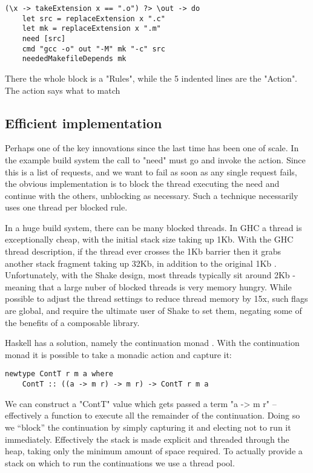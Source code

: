 \begin{lstlisting}
(\x -> takeExtension x == ".o") ?> \out -> do
    let src = replaceExtension x ".c"
    let mk = replaceExtension x ".m"
    need [src]
    cmd "gcc -o" out "-M" mk "-c" src
    neededMakefileDepends mk
\end{lstlisting}

There the whole block is a \lst"Rules", while the 5 indented lines are the \lst"Action". The action says what to match

\subsection{Efficient implementation}

Perhaps one of the key innovations since the last time has been one of scale. In the example build system the call to \lst"need" must go and invoke the action. Since this is a list of requests, and we want to fail as soon as any single request fails, the obvious implementation is to block the thread executing the need and continue with the others, unblocking as necessary. Such a technique necessarily uses one thread per blocked rule.

In a huge build system, there can be many blocked threads. In GHC a thread is exceptionally cheap, with the initial stack size taking up 1Kb. With the GHC thread description, if the thread ever crosses the 1Kb barrier then it grabs another stack fragment taking up 32Kb, in addition to the original 1Kb \cite{ghc_threads}. Unfortunately, with the Shake design, most threads typically sit around 2Kb - meaning that a large nuber of blocked threads is very memory hungry. While possible to adjust the thread settings to reduce thread memory by 15x, such flags are global, and require the ultimate user of Shake to set them, negating some of the benefits of a composable library.

Haskell has a solution, namely the continuation monad \cite{cont_paper}. With the continuation monad it is possible to take a monadic action and capture it:

\begin{lstlisting}
newtype ContT r m a where
    ContT :: ((a -> m r) -> m r) -> ContT r m a
\end{lstlisting}

We can construct a \lst"ContT" value which gets passed a term \lst"a -> m r" -- effectively a function to execute all the remainder of the continuation. Doing so we ``block'' the continuation by simply capturing it and electing not to run it immediately. Effectively the stack is made explicit and threaded through the heap, taking only the minimum amount of space required. To actually provide a stack on which to run the continuations we use a thread pool.

